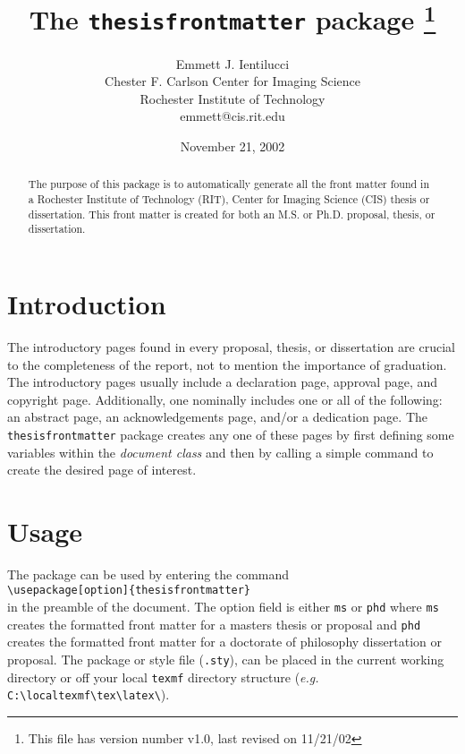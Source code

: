 \documentclass[10pt, oneside]{article}
\begin{document}
\title{The \texttt{thesisfrontmatter} package
\footnote{This file has version number v1.0, last revised on 11/21/02}}
\author{Emmett J. Ientilucci \\
Chester F. Carlson Center for Imaging Science \\
Rochester Institute of Technology \\
emmett@cis.rit.edu \\}
\date{November 21, 2002}
\maketitle

\begin{abstract}
The purpose of this package is to automatically generate all the front matter found in a
Rochester Institute of Technology (RIT), Center for Imaging Science (CIS) thesis or
dissertation. This front matter is created for both an M.S. or Ph.D. proposal, thesis, or
dissertation.
\end{abstract}

\section{Introduction}
The introductory pages found in every proposal, thesis, or dissertation are crucial to
the completeness of the report, not to mention the importance of graduation.  The
introductory pages usually include a declaration page, approval page, and copyright page.
Additionally, one nominally includes one or all of the following: an abstract page, an
acknowledgements page, and/or a dedication page. The \verb"thesisfrontmatter" package
creates any one of these pages by first defining some variables within the
\textit{document class} and then by calling a simple command to create the desired page
of interest.

\section{Usage}
The package can be used by entering the command \\

\verb"\usepackage[option]{thesisfrontmatter}" \\

\noindent in the preamble of the document.  The option field is either \verb"ms" or
\verb"phd" where \verb"ms" creates the formatted front matter for a masters thesis or
proposal and \verb"phd" creates the formatted front matter for a doctorate of philosophy
dissertation or proposal. The package or style file (\verb".sty"), can be placed in the
current working directory or off your local \texttt{texmf} directory structure
(\textit{e.g.} \verb"C:\localtexmf\tex\latex\").
\end{document}
